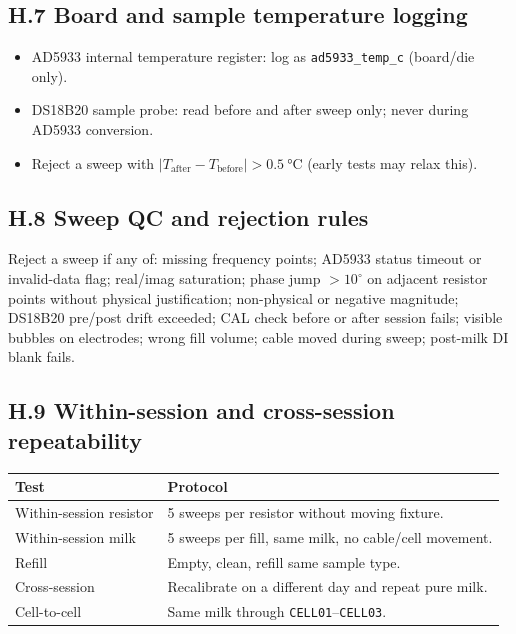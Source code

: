 \documentclass[11pt,a4paper]{article}
\begin{document}
\subsection{H.7 Board and sample temperature logging}

\begin{itemize}
\item AD5933 internal temperature register: log as \texttt{ad5933\_temp\_c} (board/die only).
\item DS18B20 sample probe: read before and after sweep only; never during AD5933 conversion.
\item Reject a sweep with $|T_\mathrm{after}-T_\mathrm{before}| > \SI{0.5}{\celsius}$ (early tests may relax this).
\end{itemize}

\subsection{H.8 Sweep QC and rejection rules}

Reject a sweep if any of: missing frequency points; AD5933 status timeout or invalid-data flag; real/imag saturation; phase jump $>10^\circ$ on adjacent resistor points without physical justification; non-physical or negative magnitude; DS18B20 pre/post drift exceeded; CAL check before or after session fails; visible bubbles on electrodes; wrong fill volume; cable moved during sweep; post-milk DI blank fails.

\subsection{H.9 Within-session and cross-session repeatability}

\begin{xltabular}{\textwidth}{L{35mm}Y}
\toprule
\textbf{Test} & \textbf{Protocol}\\
\midrule
Within-session resistor & 5 sweeps per resistor without moving fixture.\\
Within-session milk & 5 sweeps per fill, same milk, no cable/cell movement.\\
Refill & Empty, clean, refill same sample type.\\
Cross-session & Recalibrate on a different day and repeat pure milk.\\
Cell-to-cell & Same milk through \texttt{CELL01}--\texttt{CELL03}.\\
\bottomrule
\end{xltabular}
\end{document}
